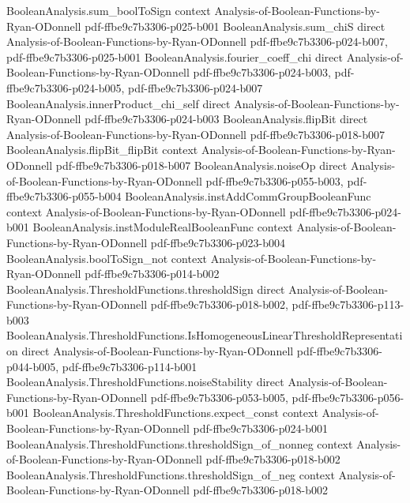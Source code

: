 \begin{theorem}
\proofstep
  {BooleanAnalysis.sum_boolToSign}
  {context}
  {Analysis-of-Boolean-Functions-by-Ryan-ODonnell}
  {pdf-ffbe9c7b3306-p025-b001}
\proofstep
  {BooleanAnalysis.sum_chiS}
  {direct}
  {Analysis-of-Boolean-Functions-by-Ryan-ODonnell}
  {pdf-ffbe9c7b3306-p024-b007,
    pdf-ffbe9c7b3306-p025-b001}
\proofstep
  {BooleanAnalysis.fourier_coeff_chi}
  {direct}
  {Analysis-of-Boolean-Functions-by-Ryan-ODonnell}
  {pdf-ffbe9c7b3306-p024-b003,
    pdf-ffbe9c7b3306-p024-b005,
    pdf-ffbe9c7b3306-p024-b007}
\proofstep
  {BooleanAnalysis.innerProduct_chi_self}
  {direct}
  {Analysis-of-Boolean-Functions-by-Ryan-ODonnell}
  {pdf-ffbe9c7b3306-p024-b003}
\proofstep
  {BooleanAnalysis.flipBit}
  {direct}
  {Analysis-of-Boolean-Functions-by-Ryan-ODonnell}
  {pdf-ffbe9c7b3306-p018-b007}
\proofstep
  {BooleanAnalysis.flipBit_flipBit}
  {context}
  {Analysis-of-Boolean-Functions-by-Ryan-ODonnell}
  {pdf-ffbe9c7b3306-p018-b007}
\proofstep
  {BooleanAnalysis.noiseOp}
  {direct}
  {Analysis-of-Boolean-Functions-by-Ryan-ODonnell}
  {pdf-ffbe9c7b3306-p055-b003,
    pdf-ffbe9c7b3306-p055-b004}
\proofstep
  {BooleanAnalysis.instAddCommGroupBooleanFunc}
  {context}
  {Analysis-of-Boolean-Functions-by-Ryan-ODonnell}
  {pdf-ffbe9c7b3306-p024-b001}
\proofstep
  {BooleanAnalysis.instModuleRealBooleanFunc}
  {context}
  {Analysis-of-Boolean-Functions-by-Ryan-ODonnell}
  {pdf-ffbe9c7b3306-p023-b004}
\proofstep
  {BooleanAnalysis.boolToSign_not}
  {context}
  {Analysis-of-Boolean-Functions-by-Ryan-ODonnell}
  {pdf-ffbe9c7b3306-p014-b002}
\proofstep
  {BooleanAnalysis.ThresholdFunctions.thresholdSign}
  {direct}
  {Analysis-of-Boolean-Functions-by-Ryan-ODonnell}
  {pdf-ffbe9c7b3306-p018-b002,
    pdf-ffbe9c7b3306-p113-b003}
\proofstep
  {BooleanAnalysis.ThresholdFunctions.IsHomogeneousLinearThresholdRepresentation}
  {direct}
  {Analysis-of-Boolean-Functions-by-Ryan-ODonnell}
  {pdf-ffbe9c7b3306-p044-b005,
    pdf-ffbe9c7b3306-p114-b001}
\proofstep
  {BooleanAnalysis.ThresholdFunctions.noiseStability}
  {direct}
  {Analysis-of-Boolean-Functions-by-Ryan-ODonnell}
  {pdf-ffbe9c7b3306-p053-b005,
    pdf-ffbe9c7b3306-p056-b001}
\proofstep
  {BooleanAnalysis.ThresholdFunctions.expect_const}
  {context}
  {Analysis-of-Boolean-Functions-by-Ryan-ODonnell}
  {pdf-ffbe9c7b3306-p024-b001}
\proofstep
  {BooleanAnalysis.ThresholdFunctions.thresholdSign_of_nonneg}
  {context}
  {Analysis-of-Boolean-Functions-by-Ryan-ODonnell}
  {pdf-ffbe9c7b3306-p018-b002}
\proofstep
  {BooleanAnalysis.ThresholdFunctions.thresholdSign_of_neg}
  {context}
  {Analysis-of-Boolean-Functions-by-Ryan-ODonnell}
  {pdf-ffbe9c7b3306-p018-b002}

\end{theorem}
